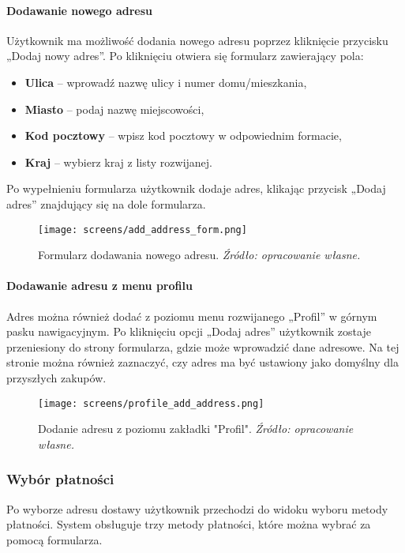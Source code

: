 \documentclass[12pt,a4paper,oneside]{article}
\theoremstyle{definition}
\numberwithin{equation}{section}
\begin{document}
\paragraph{Dodawanie nowego adresu}
Użytkownik ma możliwość dodania nowego adresu poprzez kliknięcie przycisku „Dodaj nowy adres”. Po kliknięciu otwiera się formularz zawierający pola:
\begin{itemize}
    \item \textbf{Ulica} – wprowadź nazwę ulicy i numer domu/mieszkania,
    \item \textbf{Miasto} – podaj nazwę miejscowości,
    \item \textbf{Kod pocztowy} – wpisz kod pocztowy w odpowiednim formacie,
    \item \textbf{Kraj} – wybierz kraj z listy rozwijanej.
\end{itemize}
Po wypełnieniu formularza użytkownik dodaje adres, klikając przycisk „Dodaj adres” znajdujący się na dole formularza.
\begin{figure}[H]
    \centering
    \texttt{[image: screens/add\_address\_form.png]}
    \caption{Formularz dodawania nowego adresu. \emph{Źródło: opracowanie własne.}}
    \label{fig:add_address_form}
\end{figure}
\paragraph{Dodawanie adresu z menu profilu}
Adres można również dodać z poziomu menu rozwijanego „Profil” w górnym pasku nawigacyjnym. Po kliknięciu opcji „Dodaj adres” użytkownik zostaje przeniesiony do strony formularza, gdzie może wprowadzić dane adresowe. Na tej stronie można również zaznaczyć, czy adres ma być ustawiony jako domyślny dla przyszłych zakupów.
\begin{figure}[H]
    \centering
    \texttt{[image: screens/profile\_add\_address.png]}
    \caption{Dodanie adresu z poziomu zakładki "Profil". \emph{Źródło: opracowanie własne.}}
    \label{fig:profile_add_address}
\end{figure}





\subsubsection{Wybór płatności}
Po wyborze adresu dostawy użytkownik przechodzi do widoku wyboru metody płatności. System obsługuje trzy metody płatności, które można wybrać za pomocą formularza.
\end{document}
